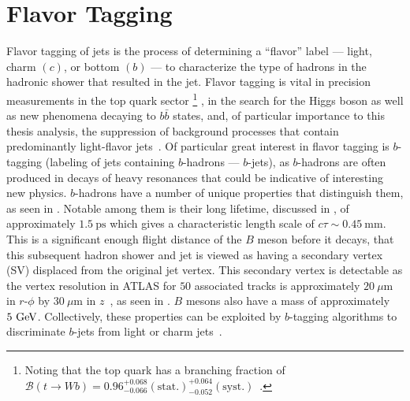 \clearpage
\section{Flavor Tagging}\label{section:flavor_tagging}

Flavor tagging of jets is the process of determining a ``flavor'' label --- light, charm $(c)$, or bottom $(b)$ --- to characterize the type of hadrons in the hadronic shower that resulted in the jet.
Flavor tagging is vital in precision measurements in the top quark sector%
\footnote{Noting that the top quark has a branching fraction of $\mathcal{B}\left(t \to W b\right) = 0.96_{-0.066}^{+0.068}\left(\mathrm{stat.}\right)_{-0.052}^{+0.064}\left(\mathrm{syst.}\right)$~\cite{Abazov:2010tm,PhysRevD.98.030001}.}%
, in the search for the Higgs boson as well as new phenomena decaying to $b\bar{b}$ states, and, of particular importance to this thesis analysis, the suppression of background processes that contain predominantly light-flavor jets~\cite{PERF-2012-04}.
Of particular great interest in flavor tagging is $b$-tagging (labeling of jets containing $b$-hadrons --- $b$-jets), as $b$-hadrons are often produced in decays of heavy resonances that could be indicative of interesting new physics.
$b$-hadrons have a number of unique properties that distinguish them, as seen in .
Notable among them is their long lifetime, discussed in , of approximately $1.5~\mathrm{ps}$ which gives a characteristic length scale of $c\tau \sim 0.45~\mathrm{mm}$.
This is a significant enough flight distance of the $B$ meson before it decays, that this subsequent hadron shower and jet is viewed as having a secondary vertex (SV) displaced from the original jet vertex.
This secondary vertex is detectable as the vertex resolution in ATLAS for $50$ associated tracks is approximately $20~\mu\mathrm{m}$ in $r$-$\phi$ by $30~\mu\mathrm{m}$ in $z$~\cite{Choi:2271033,ATL-PHYS-PUB-2015-026}, as seen in .
$B$ mesons also have a mass of approximately $5~\mathrm{GeV}$.
Collectively, these properties can be exploited by $b$-tagging algorithms to discriminate $b$-jets from light or charm jets~\cite{ATL-PHYS-PUB-2015-022,ATL-PHYS-PUB-2016-012,ATL-PHYS-PUB-2017-013,PERF-2016-05}.

